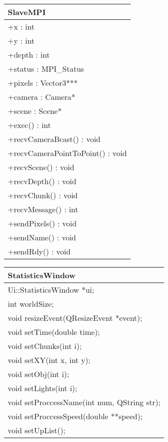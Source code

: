 \begin{center}
    \begin{tabular}{|l|}
    \hline
    SlaveMPI \\ \hline
    +x : int \\ 
	+y : int \\
	+depth : int \\
	+status : MPI\_Status \\
	+pixels : Vector3*** \\
	+camera : Camera* \\
	+scene : Scene* \\ \hline
	+exec() : int \\
	+recvCameraBcast() : void \\
	+recvCameraPointToPoint() : void \\
	+recvScene() : void \\
	+recvDepth() : void \\
	+recvChunk() : void \\
	+recvMessage() : int \\
	+sendPixels() : void \\
	+sendName() : void \\
	+sendRdy() : void \\
	\hline
    \end{tabular}
\end{center}

\begin{center}
    \begin{tabular}{|l|}
    \hline
    StatisticsWindow \\ \hline
    Ui::StatisticsWindow *ui; \\
    int worldSize; \\
    \hline
	void resizeEvent(QResizeEvent *event); \\
    void setTime(double time); \\
    void setChunks(int i); \\
    void setXY(int x, int y); \\
    void setObj(int i); \\
    void setLights(int i); \\
    void setProccessName(int num, QString str); \\
    void setProccessSpeed(double **speed); \\
    void setUpList(); \\
    \hline
    \end{tabular}
\end{center}


